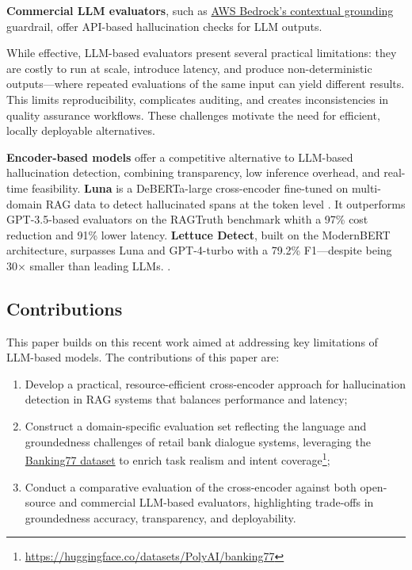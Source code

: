 \documentclass[11pt]{article}
\begin{document}
\textbf{Commercial LLM evaluators}, such as \href{https://docs.aws.amazon.com/bedrock/latest/userguide/guardrails-contextual-grounding-check.html}{AWS Bedrock’s contextual grounding} guardrail, offer API-based hallucination checks for LLM outputs. 

While effective, LLM-based evaluators present several practical limitations: they are costly to run at scale, introduce latency, and produce non-deterministic outputs---where repeated evaluations of the same input can yield different results. This limits reproducibility, complicates auditing, and creates inconsistencies in quality assurance workflows. These challenges motivate the need for efficient, locally deployable alternatives.

\textbf{Encoder-based models} offer a competitive alternative to LLM-based hallucination detection, combining transparency, low inference overhead, and real-time feasibility. \textbf{Luna} is a DeBERTa-large cross-encoder fine-tuned on multi-domain RAG data to detect hallucinated spans at the token level \citep{belyi2024luna}. It outperforms GPT-3.5-based evaluators on the RAGTruth benchmark whith a 97\% cost reduction and 91\% lower latency. \textbf{Lettuce Detect}, built on the ModernBERT architecture, surpasses Luna and GPT-4-turbo with a 79.2\% F1—despite being 30× smaller than leading LLMs. \citep{Kovacs2025LettuceDetect}. 

\subsection{Contributions}
This paper builds on this recent work aimed at addressing key limitations of LLM-based models. The contributions of this paper are:
\begin{enumerate}
    \item Develop a practical, resource-efficient cross-encoder approach for hallucination detection in RAG systems that balances performance and latency;
    \item Construct a domain-specific evaluation set reflecting the language and groundedness challenges of retail bank dialogue systems, leveraging the \href{https://huggingface.co/datasets/PolyAI/banking77}{Banking77 dataset} to enrich task realism and intent coverage\footnote{\url{https://huggingface.co/datasets/PolyAI/banking77}};
    \item Conduct a comparative evaluation of the cross-encoder against both open-source and commercial LLM-based evaluators, highlighting trade-offs in groundedness accuracy, transparency, and deployability.
\end{enumerate}
\end{document}
